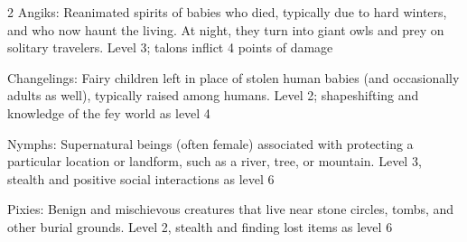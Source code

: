 \begin{multicols}{2}
Angiks: Reanimated spirits of babies who died, typically due to hard winters, and who now haunt the living. At night, they turn into giant owls and prey on solitary travelers.
Level 3; talons inflict 4 points of damage

Changelings: Fairy children left in place of stolen human babies (and occasionally adults as well), typically raised among humans.
Level 2; shapeshifting and knowledge of the fey world as level 4

Nymphs: Supernatural beings (often female) associated with protecting a particular location or landform, such as a river, tree, or mountain.
Level 3, stealth and positive social interactions as level 6

Pixies: Benign and mischievous creatures that live near stone circles, tombs, and other burial grounds.
Level 2, stealth and finding lost items as level 6


\end{multicols}
